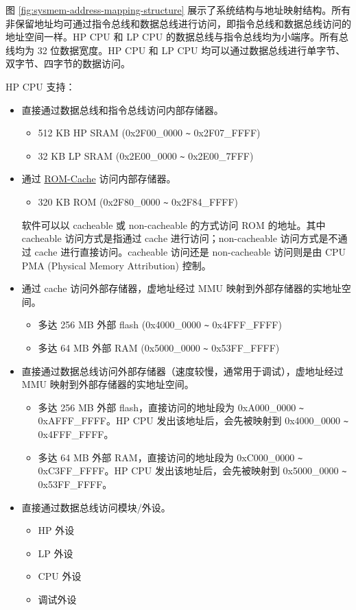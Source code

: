 \documentclass[main\_\_CN.tex]{subfiles}
\begin{document}
图 \ref{fig:sysmem-address-mapping-structure} 展示了系统结构与地址映射结构。所有非保留地址均可通过指令总线和数据总线进行访问，即指令总线和数据总线访问的地址空间一样。HP CPU 和 LP CPU 的数据总线与指令总线均为小端序。所有总线均为 32 位数据宽度。HP CPU 和 LP CPU 均可以通过数据总线进行单字节、双字节、四字节的数据访问。

HP CPU 支持：
\begin{itemize}
\item 直接通过数据总线和指令总线访问内部存储器。
  \begin{itemize}
        \item 512 KB HP SRAM (0x2F00\_0000 \verb+~+ 0x2F07\_FFFF)
        \item 32 KB LP SRAM  (0x2E00\_0000 \verb+~+ 0x2E00\_7FFF)
    \end{itemize}
\item 通过 \hyperlink{par:rom}{ROM-Cache} 访问内部存储器。
    \begin{itemize}
        \item 320 KB ROM (0x2F80\_0000 \verb+~+ 0x2F84\_FFFF)
    \end{itemize}

\begin{tiplisting}
软件可以以 cacheable 或 non-cacheable 的方式访问 ROM 的地址。其中 cacheable 访问方式是指通过 cache 进行访问；non-cacheable 访问方式是不通过 cache 进行直接访问。cacheable 访问还是 non-cacheable 访问则是由 CPU PMA (Physical Memory Attribution) 控制。
\end{tiplisting}
\item 通过 cache 访问外部存储器，虚地址经过 MMU 映射到外部存储器的实地址空间。
    \begin{itemize}
        \item 多达 256 MB 外部 flash (0x4000\_0000 \verb+~+ 0x4FFF\_FFFF)
        \item 多达 64 MB 外部 RAM (0x5000\_0000 \verb+~+ 0x53FF\_FFFF)
    \end{itemize}
\item 直接通过数据总线访问外部存储器（速度较慢，通常用于调试），虚地址经过 MMU 映射到外部存储器的实地址空间。
    \begin{itemize}
        \item 多达 256 MB 外部 flash，直接访问的地址段为 0xA000\_0000 \verb+~+ 0xAFFF\_FFFF。HP CPU 发出该地址后，会先被映射到 0x4000\_0000 \verb+~+ 0x4FFF\_FFFF。
        \item 多达 64 MB 外部 RAM，直接访问的地址段为 0xC000\_0000 \verb+~+ 0xC3FF\_FFFF。HP CPU 发出该地址后，会先被映射到 0x5000\_0000 \verb+~+ 0x53FF\_FFFF。
    \end{itemize}
\item 直接通过数据总线访问模块/外设。
    \begin{itemize}
        \item HP 外设
        \item LP 外设
        \item CPU 外设
        \item 调试外设
    \end{itemize}
\end{itemize}
\end{document}
